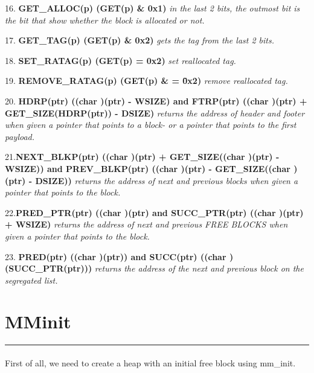 \documentclass[a4paper]{article}
\begin{document}
16. {\bf  GET\_ALLOC(p) (GET(p) \& 0x1) } {\it in the last 2 bits, the outmost bit is the bit that show whether the block is allocated or not. }
\newline  

17. {\bf GET\_TAG(p)   (GET(p) \& 0x2) } {\it gets the tag from the last 2 bits. }
\newline  

18. {\bf SET\_RATAG(p)   (GET(p)  \textbar = 0x2) }  {\it set reallocated tag.}
\newline  

19. {\bf REMOVE\_RATAG(p) (GET(p) \& = \~ 0x2) } {\it  remove reallocated tag. }
\newline  

20. {\bf  HDRP(ptr) ((char \*)(ptr) - WSIZE) and  FTRP(ptr) ((char \*)(ptr) + GET\_SIZE(HDRP(ptr)) - DSIZE) } {\it returns the address of header and footer when given a pointer that points to a block- or a pointer that points to the first payload. }
\newline  

21.{\bf NEXT\_BLKP(ptr) ((char \*)(ptr) + GET\_SIZE((char \*)(ptr) - WSIZE)) and PREV\_BLKP(ptr) ((char \*)(ptr) - GET\_SIZE((char \*)(ptr) - DSIZE)) } {\it returns the address of next and previous blocks when given a pointer that points to the block.  }
\newline  

22.{\bf PRED\_PTR(ptr) ((char \*)(ptr) and  SUCC\_PTR(ptr) ((char \*)(ptr) + WSIZE) } {\it returns the address of next and previous FREE BLOCKS when given a pointer that points to the block.  }
\newline  

23. {\bf PRED(ptr) (\*(char \*\*)(ptr)) and SUCC(ptr) (\*(char \*\*)(SUCC\_PTR(ptr))) } {\it returns the address of the next and previous block on the segregated list. }

\section{MMinit}
\noindent\rule{2cm}{0.4pt}
\paragraph{} 
 
First of all, we need to create a heap with an initial free block using mm\_init. 
    
\end{document}
